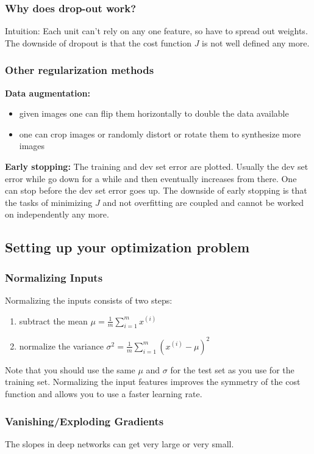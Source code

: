 \documentclass{article}
\begin{document}
\subsubsection{Why does drop-out work?}
Intuition: Each unit can't rely on any one feature, so have to spread out weights.
The downside of dropout is that the cost function $J$ is not well defined any more.

\subsubsection{Other regularization methods}
\textbf{Data augmentation:}
\begin{itemize}
  \item given images one can flip them horizontally to double the data available
  \item one can crop images or randomly distort or rotate them to synthesize more images
\end{itemize}
\textbf{Early stopping:}
The training and dev set error are plotted.
Usually the dev set error while go down for a while and then eventually increases from there.
One can stop before the dev set error goes up.
The downside of early stopping is that the tasks of minimizing $J$ and not overfitting are coupled
and cannot be worked on independently any more.

\subsection{Setting up your optimization problem}
\subsubsection{Normalizing Inputs}\label{cha:norminputs}
Normalizing the inputs consists of two steps:
\begin{enumerate}
  \item subtract the mean $\mu = \frac{1}{m}\sum_{i=1}^m x^{(i)}$
  \item normalize the variance $\sigma^2=\frac{1}{m}\sum_{i=1}^m(x^{(i)}-\mu)^2$
\end{enumerate}
Note that you should use the same $\mu$ and $\sigma$ for the test set as you use for the training set.
Normalizing the input features improves the symmetry of the cost function and allows you to use a faster learning rate.

\subsubsection{Vanishing/Exploding Gradients}
The slopes in deep networks can get very large or very small.
\end{document}
